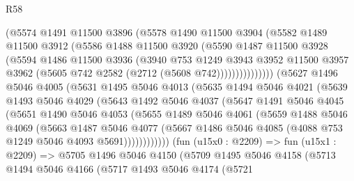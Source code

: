 \begin{lexlean}{R58}
\begin{coremodule}
                  (@5574
                    @1491
                    @11500
                    @3896
                    (@5578
                      @1490
                      @11500
                      @3904
                      (@5582
                        @1489
                        @11500
                        @3912
                        (@5586
                          @1488
                          @11500
                          @3920
                          (@5590
                            @1487
                            @11500
                            @3928
                            (@5594
                              @1486
                              @11500
                              @3936
                              (@3940
                                @753
                                @1249
                                @3943
                                @3952
                                @11500
                                @3957
                                @3962
                                (@5605 @742 @2582 (@2712 (@5608 @742)))))))))))))))
        (@5627
          @1496
          @5046
          @4005
          (@5631
            @1495
            @5046
            @4013
            (@5635
              @1494
              @5046
              @4021
              (@5639
                @1493
                @5046
                @4029
                (@5643
                  @1492
                  @5046
                  @4037
                  (@5647
                    @1491
                    @5046
                    @4045
                    (@5651
                      @1490
                      @5046
                      @4053
                      (@5655
                        @1489
                        @5046
                        @4061
                        (@5659
                          @1488
                          @5046
                          @4069
                          (@5663
                            @1487
                            @5046
                            @4077
                            (@5667 @1486 @5046 @4085 (@4088 @753 @1249 @5046 @4093 @5691))))))))))))
        (fun (u15x0 : @2209) =>
        fun (u15x1 : @2209) =>
        @5705
          @1496
          @5046
          @4150
          (@5709
            @1495
            @5046
            @4158
            (@5713
              @1494
              @5046
              @4166
              (@5717
                @1493
                @5046
                @4174
                (@5721

\end{coremodule}
\end{lexlean}
